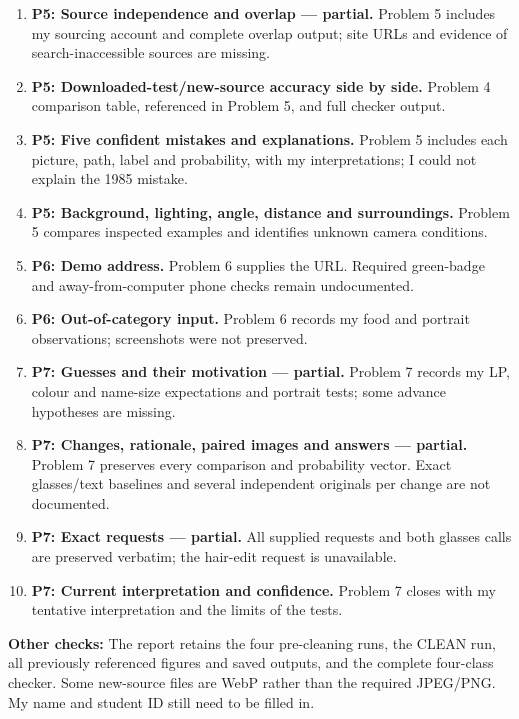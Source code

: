 \begin{enumerate}
\item \textbf{P5: Source independence and overlap --- partial.} Problem 5 includes my sourcing account and complete overlap output; site URLs and evidence of search-inaccessible sources are missing.
\item \textbf{P5: Downloaded-test/new-source accuracy side by side.} Problem 4 comparison table, referenced in Problem 5, and full checker output.
\item \textbf{P5: Five confident mistakes and explanations.} Problem 5 includes each picture, path, label and probability, with my interpretations; I could not explain the 1985 mistake.
\item \textbf{P5: Background, lighting, angle, distance and surroundings.} Problem 5 compares inspected examples and identifies unknown camera conditions.
\item \textbf{P6: Demo address.} Problem 6 supplies the URL. Required green-badge and away-from-computer phone checks remain undocumented.
\item \textbf{P6: Out-of-category input.} Problem 6 records my food and portrait observations; screenshots were not preserved.
\item \textbf{P7: Guesses and their motivation --- partial.} Problem 7 records my LP, colour and name-size expectations and portrait tests; some advance hypotheses are missing.
\item \textbf{P7: Changes, rationale, paired images and answers --- partial.} Problem 7 preserves every comparison and probability vector. Exact glasses/text baselines and several independent originals per change are not documented.
\item \textbf{P7: Exact requests --- partial.} All supplied requests and both glasses calls are preserved verbatim; the hair-edit request is unavailable.
\item \textbf{P7: Current interpretation and confidence.} Problem 7 closes with my tentative interpretation and the limits of the tests.
\end{enumerate}
\textbf{Other checks:} The report retains the four pre-cleaning runs, the CLEAN run, all previously referenced figures and saved outputs, and the complete four-class checker. Some new-source files are WebP rather than the required JPEG/PNG. My name and student ID still need to be filled in.